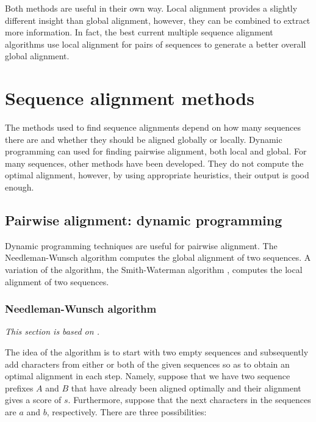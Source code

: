 Both methods are useful in their own way. Local alignment provides a slightly different insight than global alignment, however, they can
be combined to extract more information. In fact, the best current multiple sequence alignment algorithms use local alignment for pairs
of sequences to generate a better overall global alignment. \citep{msa_overview}

\section{Sequence alignment methods}

The methods used to find sequence alignments depend on how many sequences there are and whether they should be aligned globally or locally.
Dynamic programming can used for finding pairwise alignment, both local and global. For many sequences, other methods have been developed. They
do not compute the optimal alignment, however, by using appropriate heuristics, their output is good enough.

\subsection{Pairwise alignment: dynamic programming}

Dynamic programming techniques are useful for pairwise alignment. The Needle\-man-Wunsch algorithm \citep{needleman} computes the global alignment
of two sequences. A variation of the algorithm, the Smith-Waterman algorithm \citep{smith_waterman}, computes the local alignment of two sequences.

\subsubsection{Needleman-Wunsch algorithm}

\emph{This section is based on \cite{needleman}.}

The idea of the algorithm is to start with two empty sequences and subsequently add characters from either or both of the given sequences so as
to obtain an optimal alignment in each step. Namely, suppose that we have two sequence prefixes $A$ and $B$ that have already been aligned optimally
and their alignment gives a score of $s$. Furthermore, suppose that the next characters in the sequences are $a$ and $b$, respectively. There are
three possibilities:

